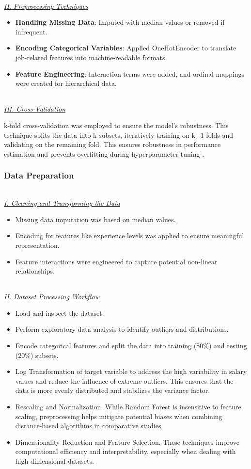\documentclass[11pt,a4paper]{article}
\newcommand{\subsubsubsection}[1]{
  {\setlength\itemindent{13pt} \textit{\uline{\\#1\\}}} 
}
\begin{document}
\subsubsubsection{II. Preprocessing Techniques}
\begin{itemize}
\item \textbf{Handling Missing Data}: Imputed with median values or removed if infrequent.
\item \textbf{Encoding Categorical Variables}:  Applied OneHotEncoder to translate job-related features into machine-readable formats.
\item \textbf{Feature Engineering}:  Interaction terms were added, and ordinal mappings were created for hierarchical data.
\end{itemize}

\subsubsubsection{III. Cross-Validation}
k-fold cross-validation was employed to ensure the model’s robustness. This technique splits the data into k subsets, iteratively training on k−1 folds and validating on the remaining fold. This ensures robustness in performance estimation and prevents overfitting during hyperparameter tuning \cite{hastie:elements}.

\subsubsection{Data Preparation}
\subsubsubsection{I. Cleaning and Transforming the Data}
\begin{itemize}
\item Missing data imputation was based on median values.
\item Encoding for features like experience levels was applied to ensure meaningful representation.
\item Feature interactions were engineered to capture potential non-linear relationships.
\end{itemize}

\subsubsubsection{II. Dataset Processing Workflow}
\begin{itemize}
\item Load and inspect the dataset.
\item Perform exploratory data analysis to identify outliers and distributions.
\item Encode categorical features and split the data into training (80\%) and testing (20\%) subsets.
\item Log Transformation of target variable to address the high variability in salary values and reduce the influence of extreme outliers. This ensures that the data is more evenly distributed and stabilizes the variance factor.
\item Rescaling and Normalization. While Random Forest is insensitive to feature scaling, preprocessing helps mitigate potential biases when combining distance-based algorithms in comparative studies.
\item Dimensionality Reduction and Feature Selection. These techniques improve computational efficiency and interpretability, especially when dealing with high-dimensional datasets.
\end{itemize}
\end{document}
